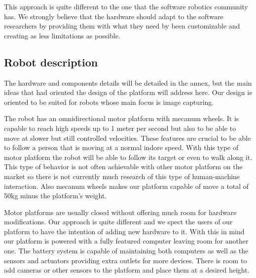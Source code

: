 This approach is quite different to the one that the software robotics community has.
We strongly believe that the hardware should adapt to the software researchers by providing them with what they need by been customizable and creating as less limitations as possible.

%
\subsection{Robot description}
The hardware and components details will be detailed in the annex, but the main ideas that had oriented the design of the platform will address here.
Our design is oriented to be suited for robots whose main focus is image capturing.

The robot has an omnidirectional motor platform with mecanum wheels.
It is capable to reach high speeds up to 1 meter per second but also to be able to move at slower but still controlled velocities.
These features are crucial to be able to follow a person that is moving at a normal indore speed.
With this type of motor platform the robot will be able to follow its target or even to walk along it.
This type of behavior is not often achievable with other motor platform on the market so there is not currently much research of this type of human-machine interaction.
Also mecanum wheels makes our platform capable of move a total of 50kg minus the platform's weight.

Motor platforms are usually closed without offering much room for hardware modifications.
Our approach is quite different and we spect the users of our platform to have the intention of adding new hardware to it.
With this in mind our platform is powered with a fully featured computer leaving room for another one.
The battery system is capable of maintaining both computers as well as the sensors and actuators providing extra outlets for more devices.
There is room to add cameras or other sensors to the platform and place them at a desired height.

